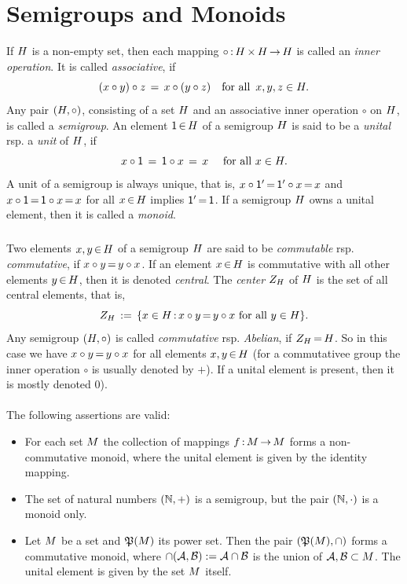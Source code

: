 \documentclass[11pt,twoside]{article}
\begin{document}
\section{Semigroups and Monoids}
If $H$ is a non-empty set,
then each mapping $\circ {\,:\,} H {\,\times\,} H {\,\to\,} H$ is called
an \textit{inner operation}.
It is  called \textit{associative}, if
\[
(x \circ y) \circ z \,=\, x \circ (y \circ z) \quad \mbox{for all }
\, x,y,z \in H.
\]
Any pair $(H,\circ)$,
consisting of a set $H$ and an associative inner operation $\circ$
on $H$,
is called a \textit{semigroup}.
An element ${\mathsf{1}} {\,\in\,} H$ of a semigroup $H$ is said to be
a \textit{unital} rsp. a \textit{unit} of $H$,
if
\[
x \circ {\mathsf{1}} \,=\, {\mathsf{1}} \circ x \,=\, x \quad \mbox{ for all }
x \in H.
\]
A unit of a semigroup is always unique,
that is,
$x \circ {\mathsf{1}}' {\,=\,} {\mathsf{1}}' \circ x {\,=\,} x$ and
$x \circ {\mathsf{1}} {\,=\,} {\mathsf{1}}  \circ x {\,=\,} x$
for all $x {\,\in\,} H$ implies ${\mathsf{1}}' {\,=\,} {\mathsf{1}}$.
If a semigroup $H$ owns a unital element,
then it is called a \textit{monoid}.

\subparagraph{}
Two elements $x,y {\,\in\,} H$ of a semigroup $H$ are said to be
\textit{commutable} rsp. \textit{commutative},
if $x \circ y {\,=\,} y \circ x$.
If an element $x {\,\in\,} H$ is commutative
with all other elements $y {\,\in\,} H$,
then it is denoted \textit{central}.
The \textit{center} $Z_{H}$ of $H$ is the set of all central elements,
that is,
\[
Z_{H} \,:=\, \{x \in H {\,:\,} x \circ y {\,=\,} y \circ x \mbox{ for all } y \in H \}.
\]
Any semigroup $(H,\circ)$ is called \textit{commutative} rsp.
\textit{Abelian},
if $Z_{H} {\,=\,} H$.
So in this case we have $x \circ y {\,=\,} y \circ x$
for all elements $x,y {\,\in\,} H$
(for a commutativee group the inner operation $\circ$ is usually denoted by $+$).
If a unital element is present,
then it is mostly denoted $0$).

\paragraph{}
The following assertions are valid:

\begin{itemize}[leftmargin=15pt]
\item[1.]
For each set $M$ the collection of mappings $f {\,:\,} M {\,\to\,} M$ forms
a non-commutative monoid,
where the unital element is given by the identity mapping.

\item[2.]
The set of natural numbers $({\mathbb{N}},+)$ is a semigroup,
but the pair $({\mathbb{N}},\cdot)$ is a monoid only.

\item[3.]
Let $M$ be a set and $\mathfrak{P}(M)$ its power set.
Then the pair $(\mathfrak{P}(M),\cap)$ forms a commutative monoid,
where $\cap(\mathcal{A},\mathcal{B}) := \mathcal{A} \cap \mathcal{B}$ is the union
of $\mathcal{A},\mathcal{B} \subset M$.
The unital element is given by the set $M$ itself.
\end{itemize}
\end{document}
